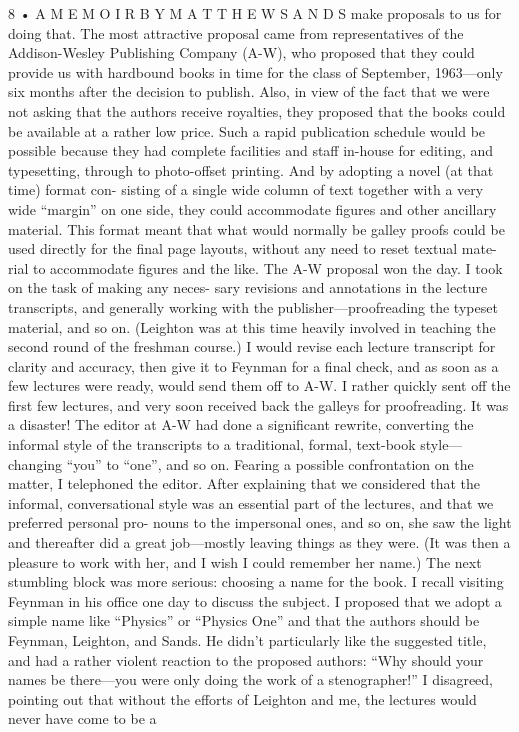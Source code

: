 \documentclass[10pt,oneside]{article}
\begin{document}
8 • A  M E M O I R  B Y  M A T T H E W  S A N D S make proposals to us for doing that. The most attractive proposal came from representatives of the Addison-Wesley Publishing Company (A-W), who proposed that they could provide us with hardbound books in time for the class of September, 1963---only six months after the decision to publish. Also, in view of the fact that we were not asking that the authors receive royalties, they proposed that the books could be available at a rather low price. Such a rapid publication schedule would be possible because they had complete facilities and staff in-house for editing, and typesetting, through to photo-offset printing. And by adopting a novel (at that time) format con- sisting of a single wide column of text together with a very wide “margin” on one side, they could accommodate figures and other ancillary material. This format meant that what would normally be galley proofs could be used directly for the final page layouts, without any need to reset textual mate- rial to accommodate figures and the like. The A-W proposal won the day. I took on the task of making any neces- sary revisions and annotations in the lecture transcripts, and generally working with the publisher---proofreading the typeset material, and so on. (Leighton was at this time heavily involved in teaching the second round of the freshman course.) I would revise each lecture transcript for clarity and accuracy, then give it to Feynman for a final check, and as soon as a few lectures were ready, would send them off to A-W. I rather quickly sent off the first few lectures, and very soon received back the galleys for proofreading. It was a disaster! The editor at A-W had done a significant rewrite, converting the informal style of the transcripts to a traditional, formal, text-book style---changing “you” to “one”, and so on. Fearing a possible confrontation on the matter, I telephoned the editor. After explaining that we considered that the informal, conversational style was an essential part of the lectures, and that we preferred personal pro- nouns to the impersonal ones, and so on, she saw the light and thereafter did a great job---mostly leaving things as they were. (It was then a pleasure to work with her, and I wish I could remember her name.) The next stumbling block was more serious: choosing a name for the book. I recall visiting Feynman in his office one day to discuss the subject. I proposed that we adopt a simple name like “Physics” or “Physics One” and that the authors should be Feynman, Leighton, and Sands. He didn’t particularly like the suggested title, and had a rather violent reaction to the proposed authors: “Why should your names be there---you were only doing the work of a stenographer!” I disagreed, pointing out that without the efforts of Leighton and me, the lectures would never have come to be a\par
\end{document}
